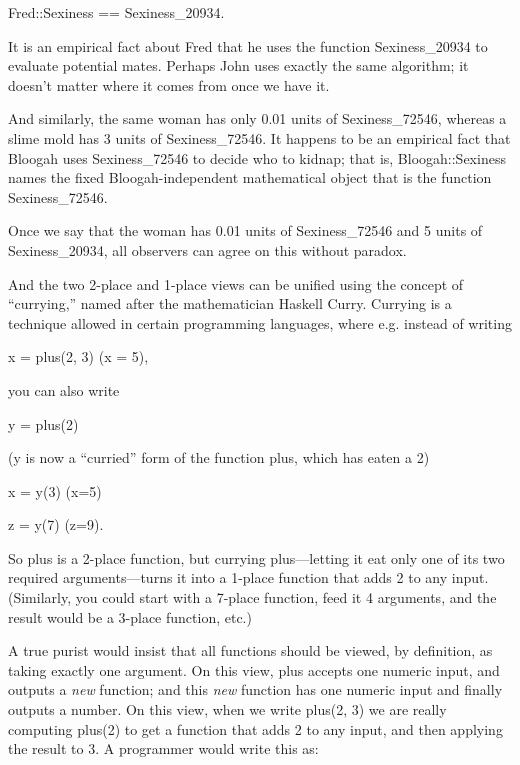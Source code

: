 {\centering
 Fred::Sexiness == Sexiness\_20934.
\par}


\bigskip

{
 It is an empirical fact about Fred that he uses the function
Sexiness\_20934 to evaluate potential mates. Perhaps John uses exactly
the same algorithm; it doesn't matter where it comes
from once we have it.}

{
 And similarly, the same woman has only 0.01 units of
Sexiness\_72546, whereas a slime mold has 3 units of Sexiness\_72546.
It happens to be an empirical fact that Bloogah uses Sexiness\_72546 to
decide who to kidnap; that is, Bloogah::Sexiness names the fixed
Bloogah-independent mathematical object that is the function
Sexiness\_72546.}

{
 Once we say that the woman has 0.01 units of Sexiness\_72546 and 5
units of Sexiness\_20934, all observers can agree on this without
paradox.}

{
 And the two 2-place and 1-place views can be unified using the
concept of ``currying,'' named after
the mathematician Haskell Curry. Currying is a technique allowed in
certain programming languages, where e.g. instead of writing}

{\centering
 x = plus(2, 3) (x = 5),
\par}


\bigskip

{
 you can also write}

{\centering
 y = plus(2)
\par}


\bigskip

{\centering
 (y is now a ``curried'' form of
the function plus, which has eaten a 2)
\par}


\bigskip

{\centering
 x = y(3) (x=5)
\par}


\bigskip

{\centering
 z = y(7) (z=9).
\par}


\bigskip

{
 So plus is a 2-place function, but currying plus---letting it eat
only one of its two required arguments---turns it into a 1-place
function that adds 2 to any input. (Similarly, you could start with a
7-place function, feed it 4 arguments, and the result would be a
3-place function, etc.)}

{
 A true purist would insist that all functions should be viewed, by
definition, as taking exactly one argument. On this view, plus accepts
one numeric input, and outputs a \textit{new} function; and this
\textit{new} function has one numeric input and finally outputs a
number. On this view, when we write plus(2, 3) we are really computing
plus(2) to get a function that adds 2 to any input, and then applying
the result to 3. A programmer would write this as:}

